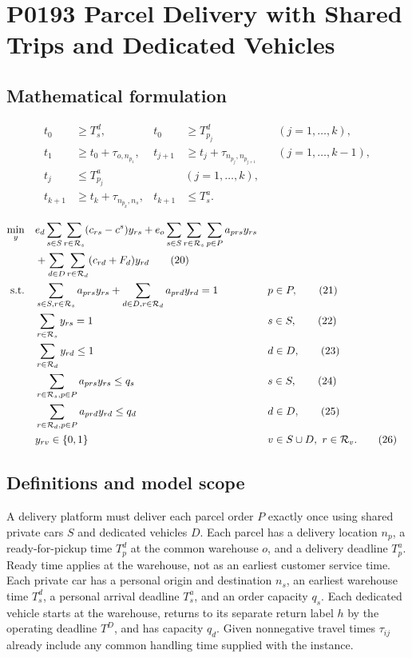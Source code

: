 \documentclass[10pt]{article}
\begin{document}
\section*{P0193 Parcel Delivery with Shared Trips and Dedicated Vehicles}
\subsection*{Mathematical formulation}
\begin{align*}
t_0&\ge T_s^d,&t_0&\ge T_{p_j}^d &&(j=1,\ldots,k),\\
t_1&\ge t_0+\tau_{o,n_{p_1}},&
t_{j+1}&\ge t_j+\tau_{n_{p_j},n_{p_{j+1}}}&&(j=1,\ldots,k-1),\\
t_j&\le T_{p_j}^a&&(j=1,\ldots,k),\\
t_{k+1}&\ge t_k+\tau_{n_{p_k},n_s},&
t_{k+1}&\le T_s^a.
\end{align*}

\begin{align}
\min_y\quad&
 e_d\sum_{s\in S}\sum_{r\in\mathcal R_s}(c_{rs}-c^s)y_{rs}
 +e_o\sum_{s\in S}\sum_{r\in\mathcal R_s}\sum_{p\in P}a_{prs}y_{rs}\notag\\
&+\sum_{d\in D}\sum_{r\in\mathcal R_d}(c_{rd}+F_d)y_{rd}\tag{20}\\
\text{s.t.}\quad&
\sum_{s\in S,r\in\mathcal R_s}a_{prs}y_{rs}
+\sum_{d\in D,r\in\mathcal R_d}a_{prd}y_{rd}=1 &&p\in P,\tag{21}\\
&\sum_{r\in\mathcal R_s}y_{rs}=1 &&s\in S,\tag{22}\\
&\sum_{r\in\mathcal R_d}y_{rd}\le1 &&d\in D,\tag{23}\\
&\sum_{r\in\mathcal R_s,p\in P}a_{prs}y_{rs}\le q_s &&s\in S,\tag{24}\\
&\sum_{r\in\mathcal R_d,p\in P}a_{prd}y_{rd}\le q_d &&d\in D,\tag{25}\\
&y_{rv}\in\{0,1\} &&v\in S\cup D,\ r\in\mathcal R_v.\tag{26}
\end{align}

\subsection*{Definitions and model scope}
A delivery platform must deliver each parcel order $P$ exactly once using shared private cars $S$ and dedicated vehicles $D$. Each parcel has a delivery location $n_p$, a ready-for-pickup time $T_p^d$ at the common warehouse $o$, and a delivery deadline $T_p^a$. Ready time applies at the warehouse, not as an earliest customer service time. Each private car has a personal origin and destination $n_s$, an earliest warehouse time $T_s^d$, a personal arrival deadline $T_s^a$, and an order capacity $q_s$. Each dedicated vehicle starts at the warehouse, returns to its separate return label $h$ by the operating deadline $T^D$, and has capacity $q_d$. Given nonnegative travel times $\tau_{ij}$ already include any common handling time supplied with the instance.
\end{document}
